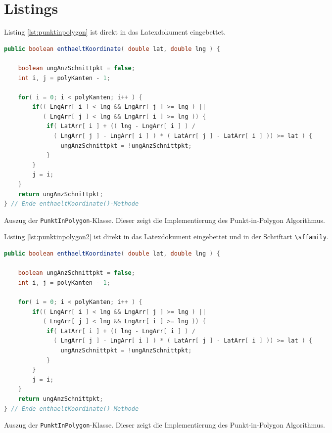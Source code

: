 \section{Listings}
\label{sec:listings}

Listing \ref{lst:punktinpolygon} ist direkt in das Latexdokument eingebettet.
\begin{code}
  \begin{lstlisting}[firstnumber=11,language=java]
public boolean enthaeltKoordinate( double lat, double lng ) {

    boolean ungAnzSchnittpkt = false;
    int i, j = polyKanten - 1;

    for( i = 0; i < polyKanten; i++ ) {
        if(( LngArr[ i ] < lng && LngArr[ j ] >= lng ) ||
           ( LngArr[ j ] < lng && LngArr[ i ] >= lng )) {
            if( LatArr[ i ] + (( lng - LngArr[ i ] ) /
              ( LngArr[ j ] - LngArr[ i ] ) * ( LatArr[ j ] - LatArr[ i ] )) >= lat ) {
                ungAnzSchnittpkt = !ungAnzSchnittpkt;
            }
        }
        j = i;
    }
    return ungAnzSchnittpkt;
} // Ende enthaeltKoordinate()-Methode
  \end{lstlisting}
  \caption[Auszug der PunktInPolygon-Klasse]{Auszug der \texttt{PunktInPolygon}-Klasse. Dieser zeigt die Implementierung des Punkt-in-Polygon Algorithmus.}
  \label{lst:punktinpolygon}
\end{code}

Listing \ref{lst:punktinpolygon2} ist direkt in das Latexdokument eingebettet und in der Schriftart \texttt{\textbackslash sffamily}.
\begin{code}
  \begin{lstlisting}[firstnumber=11,language=java,basicstyle={\footnotesize\sffamily}]
public boolean enthaeltKoordinate( double lat, double lng ) {

    boolean ungAnzSchnittpkt = false;
    int i, j = polyKanten - 1;

    for( i = 0; i < polyKanten; i++ ) {
        if(( LngArr[ i ] < lng && LngArr[ j ] >= lng ) ||
           ( LngArr[ j ] < lng && LngArr[ i ] >= lng )) {
            if( LatArr[ i ] + (( lng - LngArr[ i ] ) /
              ( LngArr[ j ] - LngArr[ i ] ) * ( LatArr[ j ] - LatArr[ i ] )) >= lat ) {
                ungAnzSchnittpkt = !ungAnzSchnittpkt;
            }
        }
        j = i;
    }
    return ungAnzSchnittpkt;
} // Ende enthaeltKoordinate()-Methode
  \end{lstlisting}
  \caption[Auszug der PunktInPolygon-Klasse]{Auszug der \texttt{PunktInPolygon}-Klasse. Dieser zeigt die Implementierung des Punkt-in-Polygon Algorithmus.}
  \label{lst:punktinpolygon2}
\end{code}


